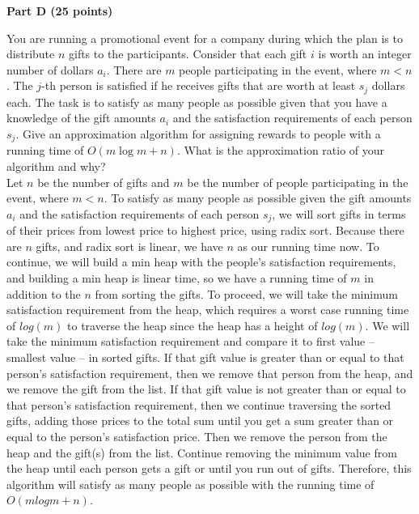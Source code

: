 \documentclass{article}
\begin{document}
\begin{center}
{\bf Part D (25 points)}
\end{center}

 You are running a promotional event for a
company during which the plan is to distribute $n$ gifts to the
participants. Consider that each gift $i$ is worth an integer number
of dollars $a_i$. There are $m$ people participating in the event,
where $m < n$. The $j$-th person is satisfied if he receives gifts
that are worth at least $s_j$ dollars each. The task is to satisfy as
many people as possible given that you have a knowledge of the gift
amounts $a_i$ and the satisfaction requirements of each person
$s_j$. Give an approximation algorithm for assigning rewards to people
with a running time of $O(m\log m+n)$. What is the approximation ratio
of your algorithm and why?\\

\noindent Let $n$ be the number of gifts and $m$ be the number of people participating in the event, where $m<n$. To satisfy as many people as possible given the gift amounts $a_i$ and the satisfaction requirements of each person $s_j$, we will sort gifts in terms of their prices from lowest price to highest price, using radix sort. Because there are $n$ gifts, and radix sort is linear, we have $n$ as our running time now. To continue, we will build a min heap with the people's satisfaction requirements, and building a min heap is linear time, so we have a running time of $m$ in addition to the $n$ from sorting the gifts. To proceed, we will take the minimum satisfaction requirement from the heap, which requires a worst case running time of $log(m)$ to traverse the heap since the heap has a height of $log(m)$. We will take the minimum satisfaction requirement and compare it to first value -- smallest value -- in sorted gifts. If that gift value is greater than or equal to that person's satisfaction requirement, then we remove that person from the heap, and we remove the gift from the list. If that gift value is not greater than or equal to that person's satisfaction requirement, then we continue traversing the sorted gifts, adding those prices to the total sum until you get a sum greater than or equal to the person's satisfaction price. Then we remove the person from the heap and the gift(s) from the list. Continue removing the minimum value from the heap until each person gets a gift or until you run out of gifts. Therefore, this algorithm will satisfy as many people as possible with the running time of $O(mlogm + n)$.
\end{document}
